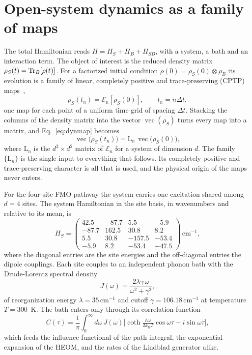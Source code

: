 \documentclass[aps,pra,twocolumn,superscriptaddress,nofootinbib,longbibliography]{revtex4-2}
\DeclareMathOperator{\vecc}{vec}
\newcommand{\rhoS}{\rho_{S}}
\newcommand{\Emap}{\mathcal{E}}
\newcommand{\Lmap}{\mathrm{L}}
\newcommand{\dt}{\Delta t}
\newcommand{\cm}{\,\mathrm{cm}^{-1}}
\begin{document}
\section{Open-system dynamics as a family of maps}
\label{sec:map}
The total Hamiltonian reads $H=H_S+H_B+H_{SB}$, with a system, a bath and an
interaction term. The object of interest is the reduced density matrix
$\rhoS(t)=\Tr_B[\rho(t)]$. For a factorized initial condition
$\rho(0)=\rhoS(0)\otimes\rho_B$ its evolution is a family of linear, completely
positive and trace-preserving (CPTP) maps~\cite{breuer2002,nielsen2010},
\begin{equation}
  \label{eq:dynmap}
  \rhoS(t_n)=\Emap_n[\rhoS(0)],\qquad t_n=n\dt,
\end{equation}
one map for each point of a uniform time grid of spacing $\dt$. Stacking the
columns of the density matrix into the vector $\vecc(\rhoS)$ turns every map into
a matrix, and Eq.~\eqref{eq:dynmap} becomes
\begin{equation}
  \label{eq:vecmap}
  \vecc\!\big(\rhoS(t_n)\big)=\Lmap_n\,\vecc\!\big(\rhoS(0)\big),
\end{equation}
where $\Lmap_n$ is the $d^2\times d^2$ matrix of $\Emap_n$ for a system of
dimension $d$. The family $\{\Lmap_n\}$ is the single input to everything that
follows. Its completely positive and trace-preserving character is all that is
used, and the physical origin of the maps never enters.

For the four-site FMO pathway the system carries one excitation shared among
$d=4$ sites. The system Hamiltonian in the site basis, in wavenumbers and
relative to its mean, is~\cite{seneviratne2024}
\begin{equation}
  \label{eq:H}
  H_S=\begin{pmatrix}
   42.5 & -87.7 & 5.5 & -5.9\\
  -87.7 & 162.5 & 30.8 & 8.2\\
   5.5 & 30.8 & -157.5 & -53.4\\
  -5.9 & 8.2 & -53.4 & -47.5
  \end{pmatrix}\cm,
\end{equation}
where the diagonal entries are the site energies and the off-diagonal entries the
dipole couplings. Each site couples to an independent phonon bath with the
Drude-Lorentz spectral density
\begin{equation}
  \label{eq:J}
  J(\omega)=\frac{2\lambda\gamma\,\omega}{\omega^{2}+\gamma^{2}},
\end{equation}
of reorganization energy $\lambda=35\cm$ and cutoff $\gamma=106.18\cm$ at
temperature $T=300$~K. The bath enters only through its correlation function
\begin{equation}
  \label{eq:Ctau}
  C(\tau)=\frac{1}{\pi}\int_0^\infty\!\!d\omega\,J(\omega)\Big[\coth\tfrac{\hbar\omega}{2k_BT}\cos\omega\tau-i\sin\omega\tau\Big],
\end{equation}
which feeds the influence functional of the path integral, the exponential
expansion of the HEOM, and the rates of the Lindblad generator alike.
\end{document}
